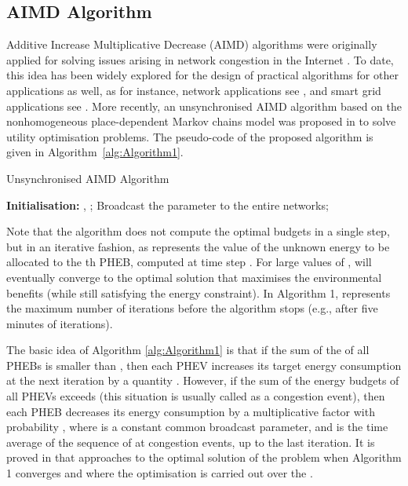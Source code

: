 \documentclass[journal]{IEEEtran}
\begin{document}
\subsection{AIMD Algorithm}

Additive Increase Multiplicative Decrease (AIMD) algorithms were originally applied for solving issues arising in network congestion in the Internet \cite{rejaie1999rap}. To date, this idea has been widely explored for the design of practical algorithms for other applications as well, as for instance, network applications see \cite{corless2012ergodic, budzisz2009strategy, shorten2005analysis}, and smart grid applications see \cite{liu2013investigation, crisostomi2014plug, studli2014optimal}. More recently, an unsynchronised AIMD algorithm based on the nonhomogeneous place-dependent Markov chains model was proposed in \cite{wirth2014nonhomogeneous} to solve utility optimisation problems. The pseudo-code of the proposed algorithm is given in Algorithm~\ref{alg:Algorithm1}.
\begin{algorithm}[htbp]
	\caption{Unsynchronised AIMD Algorithm}
	\begin{algorithmic}[1]	
		\State \textbf{Initialisation:} , ; 
		\State Broadcast the parameter  to the entire networks;
		\While{}
		\If {}
		\State 
		\State 
		\Else 
		\State   
		\EndIf 	
		\State 
		\EndWhile
	\end{algorithmic}
	\label{alg:Algorithm1}
\end{algorithm}
Note that the algorithm does not compute the optimal budgets  in a single step, but in an iterative fashion, as  represents the value of the unknown energy to be allocated to the th PHEB, computed at time step . For large values of ,  will eventually converge to the optimal solution that maximises the environmental benefits (while still satisfying the energy constraint). In Algorithm 1,  represents the maximum number of iterations before the algorithm stops (e.g., after five minutes of iterations).

The basic idea of Algorithm \ref{alg:Algorithm1} is that if the sum of the  of all PHEBs is smaller than , then each PHEV increases its target energy consumption  at the next iteration  by a quantity . However, if the sum of the energy budgets of all PHEVs exceeds  (this situation is usually called as a congestion event), then each PHEB decreases its energy consumption by a multiplicative factor  with probability , where  is a constant common broadcast parameter, and  is the time average of the sequence of  at congestion events, up to the last iteration. It is proved in \cite{wirth2014nonhomogeneous} that  approaches to the optimal solution of the problem when Algorithm 1 converges and where the optimisation is carried out over the . \\
\end{document}
